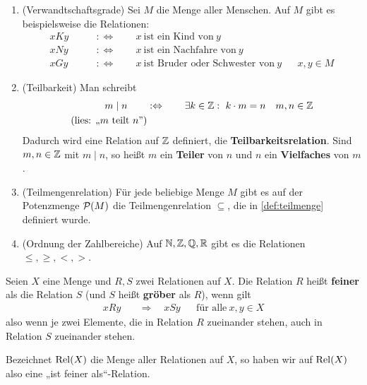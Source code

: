 \begin{bsp} \quad {} 
    \begin{enumerate}
        \item(Verwandtschaftsgrade) Sei $M$ die Menge aller Menschen. Auf $M$ gibt es beispielsweise die Relationen:
        \begin{align*}
            xKy \qquad&:\Leftrightarrow\qquad x\ \text{ist ein Kind von}\ y && \\
            xNy \qquad&:\Leftrightarrow\qquad x\ \text{ist ein Nachfahre von}\ y && \\
            xGy \qquad&:\Leftrightarrow\qquad x\ \text{ist Bruder oder Schwester von}\ y && x,y\in M
        \end{align*}
        \item(Teilbarkeit) Man schreibt
        \begin{align*}
            m \mid n \qquad& :\Leftrightarrow\qquad \exists k\in \mathbb Z:\ k\cdot m=n && m,n\in \mathbb Z \\
            (\text{lies: „$m$ teilt $n$”})
        \end{align*}
        Dadurch wird eine Relation auf $\mathbb Z$ definiert, die \textbf{Teilbarkeitsrelation}. Sind $m,n\in \mathbb Z$ mit $m\mid n$, so heißt $m$ ein \textbf{Teiler} von $n$ und $n$ ein \textbf{Vielfaches} von $m$.
        \item(Teilmengenrelation) Für jede beliebige Menge $M$ gibt es auf der Potenzmenge $\mathcal P(M)$ die Teilmengenrelation $\subseteq$, die in \cref{def:teilmenge} definiert wurde.
        \item(Ordnung der Zahlbereiche) Auf $\mathbb N,\mathbb Z,\mathbb Q,\mathbb R$ gibt es die Relationen $\le, \ge, <, >$.
    \end{enumerate}
\end{bsp}


\begin{de}  
    Seien $X$ eine Menge und $R,S$ zwei Relationen auf $X$. Die Relation $R$ heißt \textbf{feiner} als die Relation $S$ (und $S$ heißt \textbf{gröber} als $R$), wenn gilt
    \begin{align*}
        xRy \quad&\Rightarrow\quad xSy && \text{für alle}\ x,y\in X
    \end{align*}
    also wenn je zwei Elemente, die in Relation $R$ zueinander stehen, auch in Relation $S$ zueinander stehen.

    Bezeichnet $\operatorname{Rel}(X)$ die Menge aller Relationen auf $X$, so haben wir auf $\operatorname{Rel}(X)$ also eine „ist feiner als“-Relation.
\end{de}



